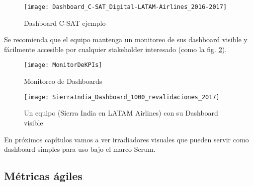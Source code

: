   \begin{figure}[h]
  \centering
  \texttt{[image: Dashboard\_C-SAT\_Digital-LATAM-Airlines\_2016-2017]}
  \caption{Dashboard C-SAT ejemplo}
  \centering
  \label{fig:Dashboard_C-SAT_Digital-LATAM-Airlines_2016-2017} %
  \end{figure}
  \FloatBarrier
  
  Se recomienda que el equipo mantenga un monitoreo de sus dashboard visible y fácilmente accesible por cualquier stakeholder interesado (como la fig. \ref{fig:MonitorDeKPIs}).
  
  \begin{figure}[h]
  \centering
  \texttt{[image: MonitorDeKPIs]}
  \caption{Monitoreo de Dashboards}
  \centering
  \label{fig:MonitorDeKPIs} %
\end{figure}
\FloatBarrier %

  \begin{figure}[h]
  \centering
  \texttt{[image: SierraIndia\_Dashboard\_1000\_revalidaciones\_2017]}
  \caption{Un equipo (Sierra India en LATAM Airlines) con su Dashboard visible}
  \centering
  \label{fig:SierraIndia_Dashboard_1000_revalidaciones_2017} %
  \end{figure}
  \FloatBarrier
  
En próximos capítulos vamos a ver irradiadores visuales que pueden servir como dashboard simples para uso bajo el marco Scrum.

\subsection{Métricas ágiles}

